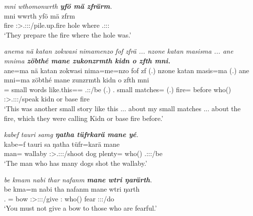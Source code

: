 \begin{exe}
	\ex \emph{mni wthomonwrth \textbf{yfö mä zfrärm}.}\\
	\gll mni wwrth yfö mä zfrm\\
	fire \Stpl:\Sbj>\Tsg.\F:\Obj:\Nonpast:\Ipfv/pile.up.fire hole where \Tsg.\F:\Sbj:\Pst:\Dur\\
	\trans `They prepare the fire where the hole was.'
	\label{ex547}
\end{exe}
\begin{exe}
	\ex \emph{anema nä katan zokwasi nimamenzo fof zfrä ... nzone katan masisma ... ane mnima \textbf{zöbthé mane zukonzrmth kidn o zfth mni.}}\\
	\gll ane=ma nä katan zokwasi nima=me=nzo fof zf (.) nzone katan masis=ma (.) ane mni=ma zöbthé mane zunzrmth kidn o zfth mni\\
	\Dem=\Char{} \Indf{} small words {like.this}=\Ins=\Only{} \Emph{} \Tsg.\F:\Rpst:\Ipfv/be (.) \Fsg.\Poss{} small matches=\Char{} (.) \Dem{} fire=\Char{} before who(\Abs) \Stpl:\Sbj>\Tsg.\F:\Obj:\Pst:\Dur/speak kidn or base fire\\
	\trans `This was another small story like this ... about my small matches ... about the fire, which they were calling Kidn or base fire before.'\\
	\label{ex548}
\end{exe}
\begin{exe}
	\ex \emph{kabef tauri samg \textbf{ŋatha tüfrkarä mane yé}.}\\
	\gll kabe=f tauri sa ŋatha tüfr=karä mane \\
	man=\Erg{} wallaby \Stsg:\Sbj>\Tsg.\Masc:\Obj:\Rpst:\Pfv/shoot dog plenty=\Prop{} who(\Abs) \Tsg.\Masc:\Sbj:\Nonpast:\Ipfv/be\\
	\trans `The man who has many dogs shot the wallaby.'
	\label{ex549}
\end{exe}
\begin{exe}
	\ex \emph{be kmam nabi thar nafanm \textbf{mane wtri ŋarärth}.}\\
	\gll be kma=m nabi tha nafanm mane wtri ŋarth\\
	\Ssg.\Erg{} \Pot=\Appr{} bow \Ssg:\Sbj>\Stpl:\Io:\Imp:\Pfv/give \Tnsg:\Dat{} who(\Abs) fear \Stpl:\Sbj:\Nonpast:\Ipfv/do\\
	\trans `You must not give a bow to those who are fearful.'
	\label{ex550}
\end{exe}

